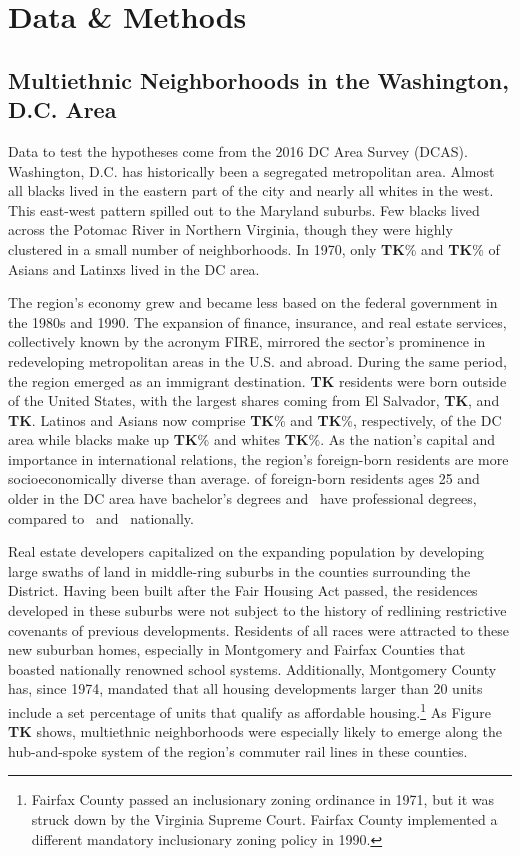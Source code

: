 \documentclass{baderart}
\newcommand{\TK}[1][]{\strong{TK #1}}
\begin{document}
\section{Data \& Methods}\label{data}
\subsection{Multiethnic Neighborhoods in the Washington, D.C. Area}\label{multiethnic-neighborhoods-in-the-washington-d.c.-area}

Data to test the hypotheses come from the 2016 DC Area Survey (DCAS). Washington, D.C. has historically been a segregated metropolitan area. Almost all blacks lived in the eastern part of the city and nearly all whites in the west. This east-west pattern spilled out to the Maryland suburbs. Few blacks lived across the Potomac River in Northern Virginia, though they were highly clustered in a small number of neighborhoods. In 1970, only \textbf{TK}\% and \textbf{TK}\% of Asians and Latinxs lived in the DC area.

The region's economy grew and became less based on the federal government in the 1980s and 1990. The expansion of finance, insurance, and real estate services, collectively known by the acronym FIRE, mirrored the sector's prominence in redeveloping metropolitan areas in the U.S. and abroad. During the same period, the region emerged as an immigrant destination. \textbf{TK} residents were born outside of the United States, with the largest shares coming from El Salvador, \textbf{TK}, and \textbf{TK}. Latinos and Asians now comprise \textbf{TK}\% and \textbf{TK}\%, respectively, of the DC area while blacks make up \textbf{TK}\% and whites \textbf{TK}\%. As the nation's capital and importance in international relations, the region's foreign-born residents are more socioeconomically diverse than average. \TK[\%] of foreign-born residents ages 25 and older in the DC area have bachelor's degrees and \TK[\%]\ have professional degrees, compared to \TK[\%]\ and \TK[\%]\ nationally. 

Real estate developers capitalized on the expanding population by developing large swaths of land in middle-ring suburbs in the counties surrounding the District. Having been built after the Fair Housing Act passed, the residences developed in these suburbs were not subject to the history of redlining restrictive covenants of previous developments. Residents of all races were attracted to these new suburban homes, especially in Montgomery and Fairfax Counties that boasted nationally renowned school systems. Additionally, Montgomery County has, since 1974, mandated that all housing developments larger than 20 units include a set percentage of units that qualify as affordable housing.\footnote{Fairfax County passed an inclusionary   zoning ordinance in 1971, but it was struck down by the Virginia   Supreme Court. Fairfax County implemented a different mandatory   inclusionary zoning policy in 1990.} As Figure \textbf{TK} shows, multiethnic neighborhoods were especially likely to emerge along the hub-and-spoke system of the region's commuter rail lines in these counties.
\end{document}
